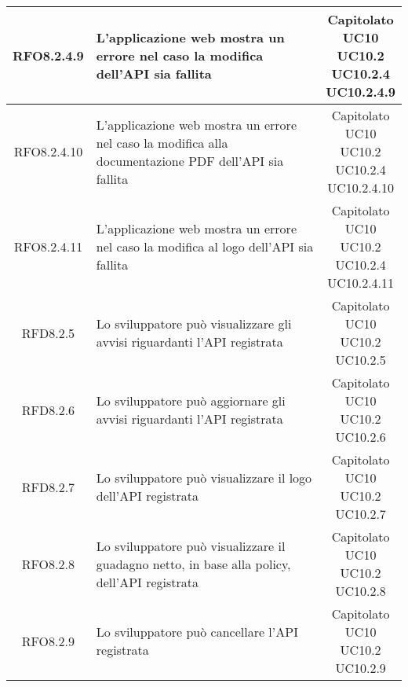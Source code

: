 \begin{longtable}{|c|p{8cm}|c|}
\hypertarget{RFO8.2.4.9}{RFO8.2.4.9} & L'applicazione web mostra un errore nel caso la modifica dell'API sia fallita & \makecell*{Capitolato\\UC10\\UC10.2\\UC10.2.4\\UC10.2.4.9} \\
\hline
\hypertarget{RFO8.2.4.10}{RFO8.2.4.10} & L'applicazione web mostra un errore nel caso la modifica alla documentazione PDF dell'API sia fallita & \makecell*{Capitolato\\UC10\\UC10.2\\UC10.2.4\\UC10.2.4.10} \\
\hline
\hypertarget{RFO8.2.4.11}{RFO8.2.4.11} & L'applicazione web mostra un errore nel caso la modifica al logo dell'API sia fallita & \makecell*{Capitolato\\UC10\\UC10.2\\UC10.2.4\\UC10.2.4.11} \\
\hline

\hypertarget{RFD8.2.5}{RFD8.2.5} & Lo sviluppatore può visualizzare gli avvisi riguardanti l'API registrata & \makecell*{Capitolato\\UC10\\UC10.2\\UC10.2.5} \\
\hline
\hypertarget{RFD8.2.6}{RFD8.2.6} & Lo sviluppatore può aggiornare gli avvisi riguardanti l'API registrata & \makecell*{Capitolato\\UC10\\UC10.2\\UC10.2.6} \\
\hline
\hypertarget{RFD8.2.7}{RFD8.2.7} & Lo sviluppatore può visualizzare il logo dell'API registrata & \makecell*{Capitolato\\UC10\\UC10.2\\UC10.2.7} \\
\hline
\hypertarget{RFO8.2.8}{RFO8.2.8} & Lo sviluppatore può visualizzare il guadagno netto, in base alla policy, dell'API registrata & \makecell*{Capitolato\\UC10\\UC10.2\\UC10.2.8} \\
\hline

\hypertarget{RFO8.2.9}{RFO8.2.9} & Lo sviluppatore può cancellare l'API registrata & \makecell*{Capitolato\\UC10\\UC10.2\\UC10.2.9} \\
\hline


\end{longtable}
